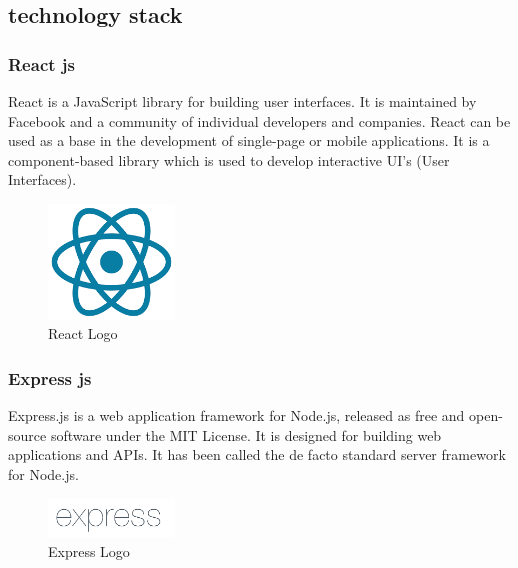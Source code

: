 \bigbreak

\newpage
\subsection{technology stack}
\subsubsection{React js}
React is a JavaScript library for building user interfaces. It is maintained by
Facebook and a community of individual developers and companies. React can be
used as a base in the development of single-page or mobile applications. It is
a component-based library which is used to develop interactive UI's (User
Interfaces).

\begin{figure}[h!]
      \centering
      \includegraphics[width=0.3\textwidth]{images/reactjs.png}
      \caption{React Logo}
      \label{fig:react}
\end{figure}

\subsubsection{Express js}
Express.js is a web application framework for Node.js, released as free
and open-source software under the MIT License. It is designed for building
web applications and APIs. It has been called the de facto standard server framework for Node.js.

\begin{figure}[h!]
      \centering
      \includegraphics[width=0.3\textwidth]{images/Expressjs.png}
      \caption{Express Logo}
      \label{fig:express}
\end{figure}

